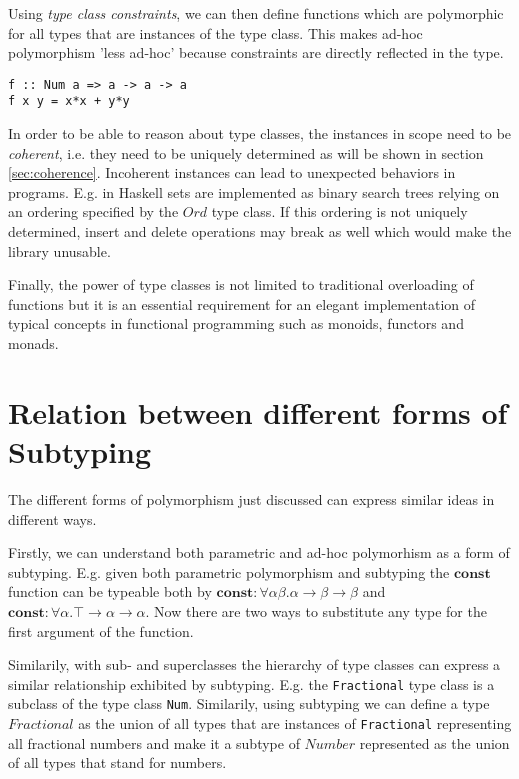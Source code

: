 Using \emph{type class constraints}, we can then define functions which are polymorphic for all types that are instances of the type class.
This makes ad-hoc polymorphism 'less ad-hoc' \cite{wadlerblott} because constraints are directly reflected in the type.

\begin{verbatim}
f :: Num a => a -> a -> a
f x y = x*x + y*y
\end{verbatim}


In order to be able to reason about type classes, the instances in scope need to be \emph{coherent}, i.e. they need to be uniquely determined as will be shown in section \ref{sec:coherence}.
Incoherent instances can lead to unexpected behaviors in programs.
E.g. in Haskell sets are implemented as binary search trees relying on an ordering specified by the $Ord$ type class.
If this ordering is not uniquely determined, insert and delete operations may break as well which would make the library unusable. \cite{Kilpatrick2019-cy}

Finally, the power of type classes is not limited to traditional overloading of functions but it is an essential requirement for an elegant implementation of typical concepts in functional programming such as monoids, functors and monads.


\section{Relation between different forms of Subtyping}\label{sec:relations}

The different forms of polymorphism just discussed can express similar ideas in different ways. 

Firstly, we can understand both parametric and ad-hoc polymorhism as a form of subtyping.
E.g. given both parametric polymorphism and subtyping the $\mathbf{const}$ function can be typeable both by
$\mathbf{const} : \forall \alpha \beta. \alpha \to \beta \to \beta$ and $\mathbf{const} : \forall \alpha. \top \to \alpha \to \alpha$.
Now there are two ways to substitute any type for the first argument of the function.

Similarily, with sub- and superclasses the hierarchy of type classes can express a similar relationship exhibited by subtyping.
E.g. the \texttt{Fractional} type class is a subclass of the type class \texttt{Num}.
Similarily, using subtyping we can define a type $\mathit{Fractional}$ as the union of all types that are instances of \texttt{Fractional} representing all fractional numbers and make it a subtype of $\mathit{Number}$ represented as the union of all types that stand for numbers.

